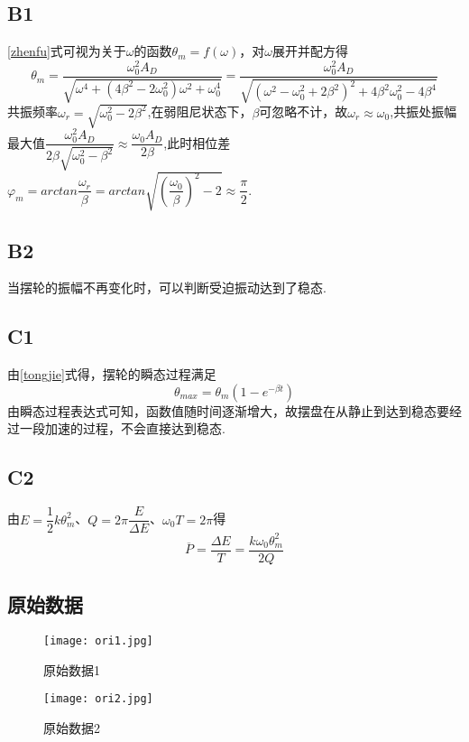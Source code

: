 \documentclass[12pt,a4paper,oneside,left=3.18,right=3.18,top=2.54,bottom=2.54]{ctexart}
\begin{document}
		\subsection{B1}
		\eqref{zhenfu}式可视为关于$\omega$的函数$\theta_m=f(\omega)$，对$\omega$展开并配方得
		$$\theta_m=\dfrac{\omega_0^2A_D}{\sqrt{\omega^4+(4\beta^2-2\omega_0^2)\omega^2+\omega_0^4}}=\dfrac{\omega_0^2A_D}{\sqrt{(\omega^2-\omega_0^2+2\beta^2)^2+4\beta^2\omega_0^2-4\beta^4}}$$
		共振频率$\omega_r=\sqrt{\omega_0^2-2\beta^2}$,在弱阻尼状态下，$\beta$可忽略不计，故$\omega_r\approx\omega_0$,共振处振幅最大值$\dfrac{\omega_0^2A_D}{2\beta\sqrt{\omega_0^2-\beta^2}}\approx\dfrac{\omega_0A_D}{2\beta}$,此时相位差$\varphi_m=arctan\dfrac{\omega_r}{\beta}=arctan\sqrt{\left(\dfrac{\omega_0}{\beta}\right)^2-2}\approx\dfrac{\pi}{2}$.
		\subsection{B2}
		当摆轮的振幅不再变化时，可以判断受迫振动达到了稳态.
		\subsection{C1}
		由\eqref{tongjie}式得，摆轮的瞬态过程满足
		$$\theta_{max}=\theta_m(1-e^{-\beta t})$$
		由瞬态过程表达式可知，函数值随时间逐渐增大，故摆盘在从静止到达到稳态要经过一段加速的过程，不会直接达到稳态.
		\subsection{C2}
		由$E=\dfrac{1}{2}k\theta_m^2$、$Q=2\pi\dfrac{E}{\Delta E}$、$\omega_0T=2\pi$得
		$$\overline{P}=\dfrac{\Delta E}{T}=\dfrac{k\omega_0\theta_m^2}{2Q}$$
\newpage
\begin{appendices}
	\renewcommand{\thesection}{附录 \Alph{section}}
	\section{原始数据}

		\begin{figure}[H]
		\centering
		\begin{turn}{0}
		\texttt{[image: ori1.jpg]}
		\end{turn}
		\caption{原始数据1}
		\label{原始1}
		\end{figure}

		\begin{figure}[H]
		\centering
		\begin{turn}{0}
		\texttt{[image: ori2.jpg]}
		\end{turn}
		\caption{原始数据2}
		\label{原始2}
		\end{figure}

\end{appendices}
\end{document}
